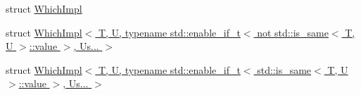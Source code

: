 \begin{DoxyCompactItemize}
struct \hyperlink{structvt_1_1util_1_1adt_1_1detail_1_1_which_impl}{Which\+Impl}
\item 
struct \hyperlink{structvt_1_1util_1_1adt_1_1detail_1_1_which_impl_3_01_t_00_01_u_00_01typename_01std_1_1enable__i4d9447de0f2954cce0452213fa3ad5db}{Which\+Impl$<$ T, U, typename std\+::enable\+\_\+if\+\_\+t$<$ not std\+::is\+\_\+same$<$ T, U $>$\+::value $>$, Us... $>$}
\item 
struct \hyperlink{structvt_1_1util_1_1adt_1_1detail_1_1_which_impl_3_01_t_00_01_u_00_01typename_01std_1_1enable__i0f067a3d2e31ed39b40aceedb711df3e}{Which\+Impl$<$ T, U, typename std\+::enable\+\_\+if\+\_\+t$<$ std\+::is\+\_\+same$<$ T, U $>$\+::value $>$, Us... $>$}
\end{DoxyCompactItemize}
